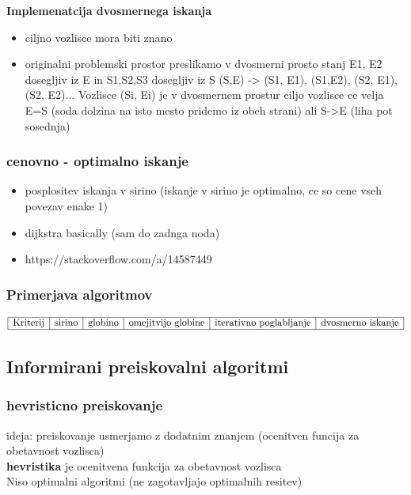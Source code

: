 \textbf{Implemenatcija dvosmernega iskanja}

\begin{itemize}[noitemsep,topsep=0pt,leftmargin=*]
    \item ciljno vozlisce mora biti znano
    \item originalni problemski prostor preslikamo v dvosmerni prosto stanj
    E1, E2 dosegljiv iz E in S1,S2,S3 dosegljiv iz S
    (S,E) -> {(S1, E1), (S1,E2), (S2, E1), (S2, E2)...}
    Vozlisce (Si, Ei) je v dvosmernem prostur ciljo vozlisce ce velja E=S (soda dolzina na isto mesto pridemo iz obeh strani) ali S->E (liha pot sosednja)
\end{itemize}

\subsubsection{cenovno - optimalno iskanje}
\begin{itemize}[noitemsep,leftmargin=*,topsep=0pt]
    \item posplositev iskanja v sirino (iskanje v sirino je optimalno, ce so cene vseh povezav enake 1)\\
    \item dijkstra basically (sam do zadnga noda)
    \item https://stackoverflow.com/a/14587449
\end{itemize}


\subsubsection{Primerjava algoritmov}

$$
\begin{array}{|c|c|c|c|c|c|}
   \hline 
   \text{Kriterij} & \text{sirino} & \text{globino} & \text{omejitvijo globine} & \text{iterativno poglabljanje} & \text{dvosmerno iskanje}\\
   \hline
\end{array}
$$


\subsection{Informirani preiskovalni algoritmi}

\subsubsection{hevristicno preiskovanje}
ideja: preiskovanje usmerjamo z dodatnim znanjem (ocenitven funcija za obetavnost vozlisca)\\
\textbf{hevristika} je ocenitvena funkcija za obetavnost vozlisca\\
Niso optimalni algoritmi (ne zagotavljajo optimalnih resitev)\\

